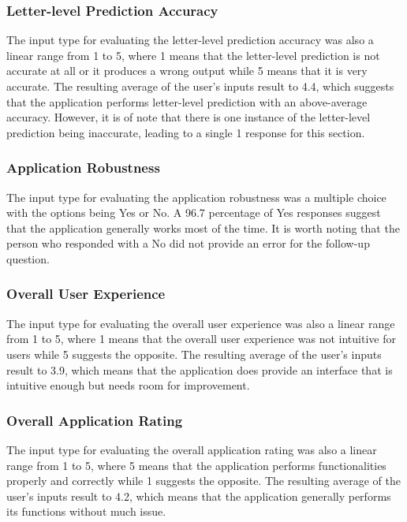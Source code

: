 \documentclass[journal]{./IEEE/IEEEtran}
\begin{document}
\subsubsection{Letter-level Prediction Accuracy}

The input type for evaluating the letter-level prediction accuracy was also a linear range from 1 to 5, where 1 means that the letter-level prediction is not accurate at all or it produces a wrong output while 5 means that it is very accurate. The resulting average of the user's inputs result to 4.4, which suggests that the application performs letter-level prediction with an above-average accuracy. However, it is of note that there is one instance of the letter-level prediction being inaccurate, leading to a single 1 response for this section.

\subsubsection{Application Robustness}

The input type for evaluating the application robustness was a multiple choice with the options being Yes or No. A 96.7 percentage of Yes responses suggest that the application generally works most of the time. It is worth noting that the person who responded with a No did not provide an error for the follow-up question.

\subsubsection{Overall User Experience}

The input type for evaluating the overall user experience was also a linear range from 1 to 5, where 1 means that the overall user experience was not intuitive for users while 5 suggests the opposite. The resulting average of the user's inputs result to 3.9, which means that the application does provide an interface that is intuitive enough but needs room for improvement.

\subsubsection{Overall Application Rating}

The input type for evaluating the overall application rating was also a linear range from 1 to 5, where 5 means that the application performs functionalities properly and correctly while 1 suggests the opposite. The resulting average of the user's inputs result to 4.2, which means that the application generally performs its functions without much issue.
\end{document}

